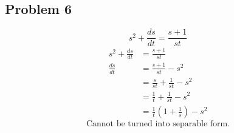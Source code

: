 \documentclass{article}
\begin{document}
\subsection{Problem 6}
$$ s^2 + \frac{ds}{dt} = \frac{s+1}{st} $$
\begin{align*}
    s^2 + \frac{ds}{dt} & = \frac{s+1}{st} \\
    \frac{ds}{dt} & = \frac{s+1}{st} - s^2 \\
                  & = \frac{s}{st} + \frac{1}{st} - s^2 \\
                  & = \frac{1}{t} + \frac{1}{st} - s^2 \\
                  & = \frac{1}{t}\left(1 + \frac{1}{s}\right) - s^2
\end{align*}
\begin{equation*}
    \boxed{\text{Cannot be turned into separable form.}}
\end{equation*}
\end{document}
